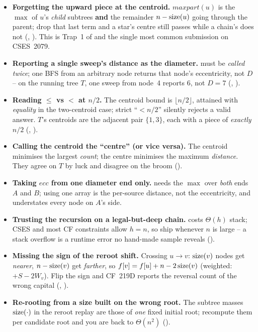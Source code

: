\begin{itemize}[nosep, leftmargin=1.4em]
  \item \textbf{Forgetting the upward piece at the centroid.} $\mathit{maxpart}(u)$ is the
        $\max$ of $u$'s \emph{child} subtrees \textbf{and} the remainder $n-\operatorname{size}(u)$ going
        through the parent; drop that last term and a star's centre still passes while a
        chain's does not (, ). This is Trap~1 of
         and the single most common submission on CSES~2079.
  \item \textbf{Reporting a single sweep's distance as the diameter.} 
        must be \emph{called twice}; one BFS from an arbitrary node returns that node's
        eccentricity, not $D$ -- on the running tree $T$, one sweep from node~4 reports
        $6$, not $D=7$ (, ).
  \item \textbf{Reading $\le$ vs $<$ at $n/2$.} The centroid bound is $\lfloor n/2\rfloor$,
        attained with \emph{equality} in the two-centroid case; strict ``$< n/2$'' silently
        rejects a valid answer. $T$'s centroids are the adjacent pair $\{1,3\}$, each with a
        piece of \emph{exactly} $n/2$ (, ).
  \item \textbf{Calling the centroid the ``centre'' (or vice versa).} The centroid minimises
        the largest \emph{count}; the centre minimises the maximum \emph{distance}. They agree
        on $T$ by luck and disagree on the broom ().
  \item \textbf{Taking $\mathit{ecc}$ from one diameter end only.}  needs
        the $\max$ over \emph{both} ends $A$ and $B$; using one array is the per-source
        distance, not the eccentricity, and understates every node on $A$'s side.
  \item \textbf{Trusting the recursion on a legal-but-deep chain.}  costs
        $\Theta(h)$ stack; CSES and most CF constraints allow $h=n$, so ship
         whenever $n$ is large -- a stack overflow is a runtime error no
        hand-made sample reveals ().
  \item \textbf{Missing the sign of the reroot shift.} Crossing $u\to v$: $\operatorname{size}(v)$ nodes get
        \emph{nearer}, $n-\operatorname{size}(v)$ get \emph{farther}, so $f[v]=f[u]+n-2\operatorname{size}(v)$ (weighted:
        $+S-2W_v$). Flip the sign and CF~219D reports the reversal count of the wrong capital
        (, ).
  \item \textbf{Re-rooting from a size built on the wrong root.} The subtree masses $\operatorname{size}(\cdot)$
        in the reroot replay are those of \emph{one} fixed initial root; recompute them per
        candidate root and you are back to $\Theta(n^2)$ ().
\end{itemize}

